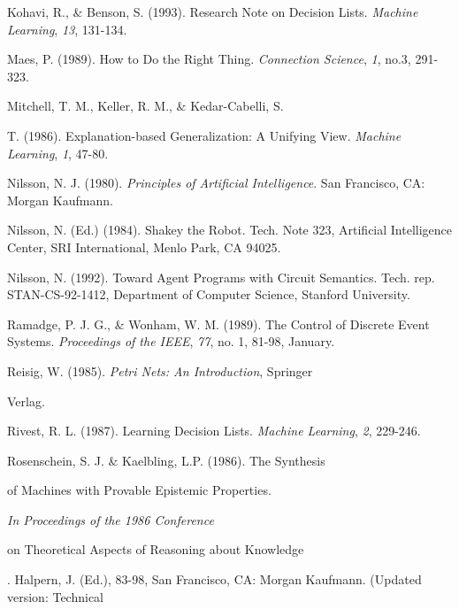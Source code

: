 \begin{thebibliography}{}
Kohavi, R., \& Benson, S. (1993). Research Note on Decision Lists. {\it  
Machine Learning}, {\it 13}, 131-134.

Maes, P. (1989). How to Do the Right Thing. {\it Connection Science}, {\it  
1}, no.3, 291-323.

Mitchell, T. M., Keller, R. M., \& Kedar-Cabelli, S. 

T. (1986). Explanation-based Generalization:  A Unifying View.
{\it Machine Learning}, {\it 1}, 47-80.

Nilsson, N. J. (1980). {\it Principles of Artificial Intelligence}. San  
Francisco, CA: Morgan Kaufmann.

Nilsson, N. (Ed.) (1984).  Shakey the Robot. Tech. Note 323, Artificial  
Intelligence Center, SRI International, Menlo Park, CA 94025.

Nilsson, N. (1992).  Toward Agent Programs with Circuit Semantics. Tech. rep.  
STAN-CS-92-1412, Department of Computer Science, Stanford University.

Ramadge, P. J. G., \& Wonham, W. M. (1989). The Control of Discrete Event  
Systems. {\it Proceedings of the IEEE}, {\it 77}, no. 1, 81-98, January.

Reisig, W. (1985). {\it Petri Nets:  An Introduction}, Springer 

Verlag.

Rivest, R. L. (1987). Learning Decision Lists.  {\it Machine Learning}, {\it  
2},  229-246.


Rosenschein, S. J. \& Kaelbling, L.P. (1986). The Synthesis 

of Machines with Provable Epistemic Properties. {\it In Proceedings of the  
1986 Conference 

on Theoretical Aspects of Reasoning about Knowledge}. Halpern, J. (Ed.),   
83-98, San Francisco, CA: Morgan Kaufmann. (Updated version: Technical 


\end{thebibliography}
